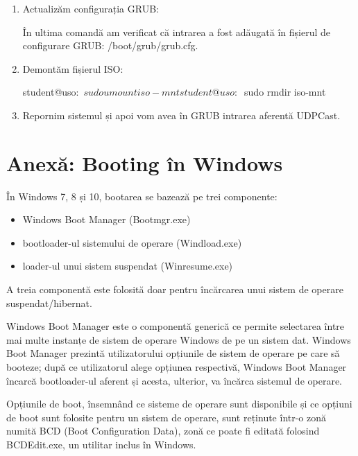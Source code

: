 \begin{enumerate}
	\item Actualizăm configurația GRUB:

\begin{screen}
student@uso:~$ sudo update-grub
Generating grub configuration file ...
[...]
done
student@uso:~$ grep UDPCast /boot/grub/grub.cfg
menuentry 'UDPCast' {
\end{screen}

În ultima comandă am verificat că intrarea a fost adăugată în fișierul de configurare GRUB: /boot/grub/grub.cfg.

	\item Demontăm fișierul ISO:

\begin{screen}
student@uso:~$ sudo umount iso-mnt
student@uso:~$ sudo rmdir iso-mnt
\end{screen}

	\item Repornim sistemul și apoi vom avea în GRUB intrarea aferentă UDPCast.
\end{enumerate}

\section{Anexă: Booting în Windows}
\label{sec:boot-init-win}

În Windows 7, 8 și 10, bootarea se bazează pe trei componente:

\begin{itemize}
	\item Windows Boot Manager (Bootmgr.exe)
	\item bootloader-ul sistemului de operare (Windload.exe)
	\item loader-ul unui sistem suspendat (Winresume.exe)
\end{itemize}

A treia componentă este folosită doar pentru încărcarea unui sistem de operare suspendat/hibernat.

Windows Boot Manager este o componentă generică ce permite selectarea între mai
multe instanțe de sistem de operare Windows de pe un sistem dat. Windows Boot
Manager prezintă utilizatorului opțiunile de sistem de operare pe care să
booteze; după ce utilizatorul alege opțiunea respectivă, Windows Boot Manager
încarcă bootloader-ul aferent și acesta, ulterior, va încărca sistemul de
operare.

Opțiunile de boot, însemnând ce sisteme de operare sunt disponibile și ce
opțiuni de boot sunt folosite pentru un sistem de operare, sunt reținute într-o
zonă numită BCD  (Boot Configuration Data),
zonă ce poate fi editată folosind BCDEdit.exe, un utilitar inclus în Windows.

